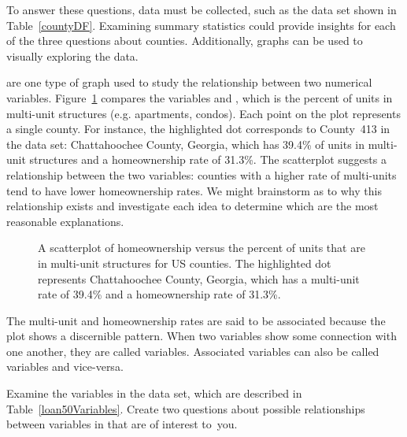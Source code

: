To answer these questions, data must be collected, such
as the  data set shown in Table~\ref{countyDF}.
Examining summary statistics  could
provide insights for each of the three questions about counties.
Additionally, graphs can be used to visually exploring the data.

 are one type of graph
used to study the relationship between two numerical variables.
Figure~\ref{multiunitsVsOwnership} compares the variables
 and
,
which is the percent of units in multi-unit structures
(e.g. apartments, condos).
Each point on the plot represents a single county.
For instance, the highlighted dot corresponds to
County~413 in the  data set:
Chattahoochee County, Georgia, which has 39.4\% of
units in multi-unit structures and a homeownership rate
of 31.3\%.
The scatterplot suggests a relationship between the
two variables: counties with a higher rate of multi-units
tend to have lower homeownership rates.
We might brainstorm as to why this relationship exists
and investigate each idea to determine which are the most
reasonable explanations.

\begin{figure}
  \centering
  \caption{A scatterplot of homeownership versus the percent
      of units that are in multi-unit structures for US counties.
      The highlighted dot represents Chattahoochee County, Georgia,
      which has a multi-unit rate of 39.4\% and a homeownership rate
      of 31.3\%.}
  \label{multiunitsVsOwnership}
\end{figure}

The multi-unit and homeownership rates are said to be
associated because the plot shows a discernible pattern.
When two variables show some connection with one another,
they are called  variables.
Associated variables can also be called 
variables and vice-versa.

\begin{exercisewrap}
\begin{nexercise}
Examine the variables in the  data set,
which are described in Table~\vref{loan50Variables}.
Create two questions about possible relationships
between variables in  that are of interest
to~you.\footnotemark
\end{nexercise}
\end{exercisewrap}

